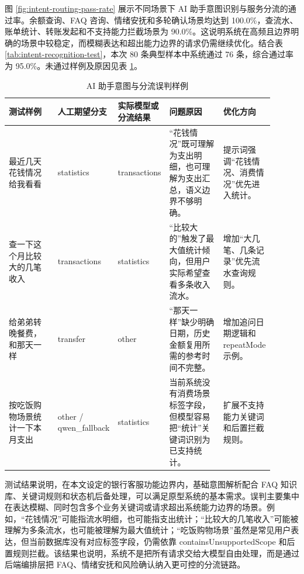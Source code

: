 \documentclass[bachelor, print]{xduthesis}
\begin{document}
图 \ref{fig:intent-routing-pass-rate} 展示不同场景下 AI 助手意图识别与服务分流的通过率。余额查询、FAQ 咨询、情绪安抚和多轮确认场景均达到 100.0\%，查流水、账单统计、转账发起和不支持能力拦截场景为 90.0\%。这说明系统在高频且边界明确的场景中较稳定，而模糊表达和超出能力边界的请求仍需继续优化。结合表 \ref{tab:intent-recognition-test}，本次 80 条典型样本中系统通过 76 条，综合通过率为 95.0\%。未通过样例及原因见表 \ref{tab:intent-error-samples}。

\begin{table}[H]
    \centering
    \caption{AI 助手意图与分流误判样例}
    \label{tab:intent-error-samples}
    \scriptsize
    \setlength{\tabcolsep}{2pt}
    \begin{tabular}{|p{0.22\linewidth}|p{0.14\linewidth}|p{0.17\linewidth}|p{0.24\linewidth}|p{0.13\linewidth}|}
        \hline
        测试样例 & 人工期望分支 & 实际模型或分流结果 & 问题原因 & 优化方向 \\
        \hline
        最近几天花钱情况给我看看 & statistics & transactions & “花钱情况”既可理解为支出明细，也可理解为支出汇总，语义边界不够明确。 & 提示词强调“花钱情况、消费情况”优先进入统计。 \\
        \hline
        查一下这个月比较大的几笔收入 & transactions & statistics & “比较大的”触发了最大值统计倾向，但用户实际希望查看多条收入流水。 & 增加“大几笔、几条记录”优先流水查询规则。 \\
        \hline
        给弟弟转晚餐费，和那天一样 & transfer & other & “那天一样”缺少明确日期，历史金额复用所需的参考时间不完整。 & 增加追问日期逻辑和 repeatMode 示例。 \\
        \hline
        按吃饭购物场景统计一下本月支出 & other / qwen\_fallback & statistics & 当前系统没有消费场景标签字段，但模型容易把“统计”关键词识别为已支持统计。 & 扩展不支持能力关键词和后置拦截规则。 \\
        \hline
    \end{tabular}
\end{table}

测试结果说明，在本文设定的银行客服功能边界内，基础意图解析配合 FAQ 知识库、关键词规则和状态机后备处理，可以满足原型系统的基本需求。误判主要集中在表达模糊、同时包含多个业务关键词或请求超出系统能力边界的场景。例如，“花钱情况”可能指流水明细，也可能指支出统计；“比较大的几笔收入”可能被理解为多条流水，也可能被理解为最大值统计；“吃饭购物场景”虽然是常见用户表达，但当前数据库没有对应标签字段，仍需依靠 containsUnsupportedScope 和后置规则拦截。该结果也说明，系统不是把所有请求交给大模型自由处理，而是通过后端编排层把 FAQ、情绪安抚和风险确认纳入更可控的分流链路。
\end{document}
